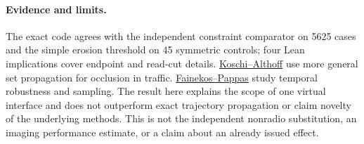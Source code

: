 \documentclass{article}
\begin{document}
\paragraph{Evidence and limits.}
The exact code agrees with the independent constraint comparator
on 5625 cases and the simple erosion threshold on 45 symmetric
controls; four Lean implications cover endpoint and read-cut details.
\href{https://mediatum.ub.tum.de/doc/1575358/2n3lb03tprh28cbg1n19faj8w.Koschi_TIV2020_final.pdf}{Koschi--Althoff}
use more general set propagation for occlusion in traffic.
\href{https://georgejpappas.org/papers/J46.pdf}{Fainekos--Pappas}
study temporal robustness and sampling. The result here explains
the scope of one virtual interface and does not outperform exact
trajectory propagation or claim novelty of the underlying methods.
This is not the independent nonradio substitution, an imaging
performance estimate, or a claim about an already issued effect.
\end{document}

